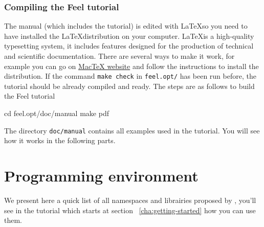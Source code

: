 


\subsubsection{Compiling the Feel tutorial}
\label{sec:comp-feel-tutor}
The manual (which includes the tutorial) is edited with \LaTeX  so you need to have installed the \LaTeX  distribution on your computer. \LaTeX  is a high-quality typesetting system, it includes features designed for the production of technical and scientific documentation. There are several ways to make it work, for example you can go on \href{http://www.tug.org/mactex/}{MacTeX website} and follow the instructions to install the distribution. If the command \lstinline|make check| in \lstinline|feel.opt/| has been run before, the tutorial
should be already compiled and ready. The steps are as follows to build the Feel tutorial
\begin{unixcom}
  cd feel.opt/doc/manual
  make pdf
\end{unixcom}
%
The directory \lstinline|doc/manual| contains all examples used in the tutorial. You will see how it works in the following parts.

\section{Programming environment}
\label{sec:progr-envir}
We present here a quick list of all namespaces and librairies proposed by \feel, you'll see in the tutorial which starts at section ~\ref{cha:getting-started} how you can use them.
